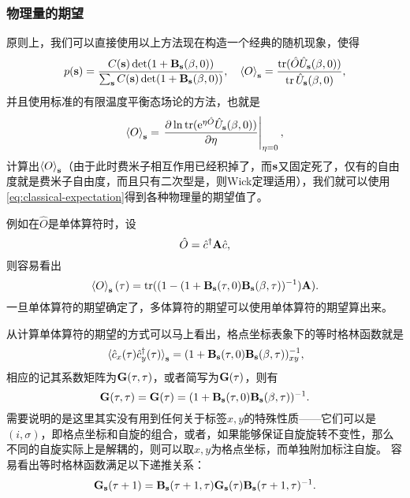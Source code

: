 \documentclass[hyperref, UTF8, a4paper]{ctexart}
\newcommand*{\ee}{\mathrm{e}}
\begin{document}
\subsubsection{物理量的期望}

原则上，我们可以直接使用以上方法现在构造一个经典的随机现象，使得
\begin{equation}
    p(\vb{s}) = \frac{ C(\vb{s}) \det(1 + \vb{B}_{\vb{s}}(\beta, 0))}{\sum_{\vb{s}} C(\vb{s}) \det(1 + \vb{B}_{\vb{s}}(\beta, 0))}, \quad \expval{O}_{\vb{s}} = \frac{\trace(\hat{O} \hat{U}_{\vb{s}}(\beta, 0))}{\trace \hat{U}_{\vb{s}}(\beta, 0)},
    \label{eq:ftqmc-prob}
\end{equation}
并且使用标准的有限温度平衡态场论的方法，也就是
\begin{equation}
    \expval{O}_{\vb{s}} = \eval{\pdv{\ln \trace(\ee^{\eta \hat{O}} \hat{U}_{\vb{s}}(\beta, 0))}{\eta}}_{\eta=0},
\end{equation}
计算出$\expval{O}_{\vb{s}}$（由于此时费米子相互作用已经积掉了，而$\vb{s}$又固定死了，仅有的自由度就是费米子自由度，而且只有二次型是，则Wick定理适用），我们就可以使用\eqref{eq:classical-expectation}得到各种物理量的期望值了。

例如在$\hat{O}$是单体算符时，设
\begin{equation}
    \hat{O} = \hat{c}^\dagger \vb{A} \hat{c},
\end{equation}
则容易看出
\begin{equation}
    \expval{O}_{\vb{s}}(\tau) = \trace((1 - (1+ \vb{B}_{\vb{s}}(\tau, 0) \vb{B}_{\vb{s}}(\beta, \tau))^{-1}) \vb{A}).
\end{equation}
一旦单体算符的期望确定了，多体算符的期望可以使用单体算符的期望算出来。

从计算单体算符的期望的方式可以马上看出，格点坐标表象下的等时格林函数就是
\begin{equation}
    \expval*{\hat{c}_x(\tau) \hat{c}^\dagger_y(\tau)}_{\vb{s}} = (1+ \vb{B}_{\vb{s}}(\tau, 0) \vb{B}_{\vb{s}}(\beta, \tau))^{-1}_{xy},
\end{equation}
相应的记其系数矩阵为$\vb{G}(\tau, \tau)$，或者简写为$\vb{G}(\tau)$，则有
\begin{equation}
    \vb{G}(\tau, \tau) = \vb{G}(\tau) = (1+ \vb{B}_{\vb{s}}(\tau, 0) \vb{B}_{\vb{s}}(\beta, \tau))^{-1}.
\end{equation}
需要说明的是这里其实没有用到任何关于标签$x, y$的特殊性质——它们可以是$(i, \sigma)$，即格点坐标和自旋的组合，或者，如果能够保证自旋旋转不变性，那么不同的自旋实际上是解耦的，则可以取$x, y$为格点坐标，而单独附加标注自旋。
容易看出等时格林函数满足以下递推关系：
\begin{equation}
    \vb{G}_{\vb{s}}(\tau + 1) = \vb{B}_{\vb{s}}(\tau+1, \tau) \vb{G}_{\vb{s}}(\tau) \vb{B}_{\vb{s}}(\tau+1, \tau)^{-1}.
    \label{eq:eq-time-green-function-iter}
\end{equation}
\end{document}
